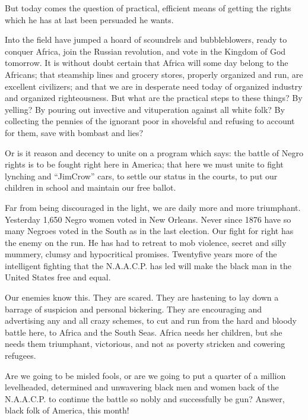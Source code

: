 \documentclass[letterpaper,10pt,english]{jupyterBook}
\begin{document}
\sphinxAtStartPar
But today comes the question of practical, efficient means of getting the rights which he has at last been persuaded he wants.

\sphinxAtStartPar
Into the field have jumped a hoard of scoundrels and bubble\sphinxhyphen{}blowers, ready to conquer Africa, join the Russian revolution, and vote in the Kingdom of God tomorrow. It is without doubt certain that Africa will some day belong to the Africans; that steamship lines and grocery stores, properly organized and run, are excellent civilizers; and that we are in desperate need today of organized industry and organized righteousness. But what are the practical steps to these things? By yelling? By pouring out invective and vituperation against all white folk? By collecting the pennies of the ignorant poor in shovelsful and refusing to account for them, save with bombast and lies?

\sphinxAtStartPar
Or is it reason and decency to unite on a program which says: the battle of Negro rights is to be fought right here in America; that here we must unite to fight lynching and “Jim\sphinxhyphen{}Crow” cars, to settle our status in the courts, to put our children in school and maintain our free ballot.

\sphinxAtStartPar
Far from being discouraged in the light, we are daily more and more triumphant. Yesterday 1,650 Negro women voted in New Orleans. Never since 1876 have so many Negroes voted in the South as in the last election. Our fight for right has the enemy on the run. He has had to retreat to mob violence, secret and silly mummery, clumsy and hypocritical promises. Twenty\sphinxhyphen{}five years more of the intelligent fighting that the N.A.A.C.P. has led will make the black man in the United States free and equal.

\sphinxAtStartPar
Our enemies know this. They are scared. They are hastening to lay down a barrage of suspicion and personal bickering. They are encouraging and advertising any and all crazy schemes, to cut and run from the hard and bloody battle here, to Africa and the South Seas. Africa needs her children, but she needs them triumphant, victorious, and not as poverty\sphinxhyphen{}
stricken and cowering refugees.

\sphinxAtStartPar
Are we going to be misled fools, or are we going to put a quarter of a million level\sphinxhyphen{}headed, determined and unwavering black men and women back of the N.A.A.C.P. to continue the battle so nobly and successfully be­ gun? Answer, black folk of America, this month!
\end{document}
